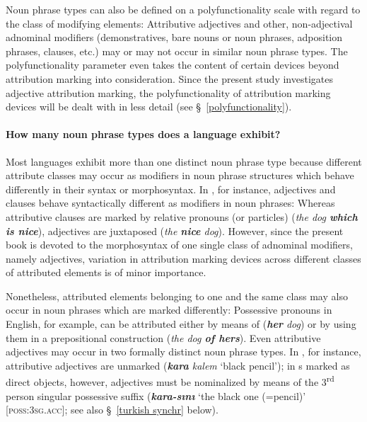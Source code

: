 Noun phrase types can also be defined on a polyfunctionality scale with regard to the class of modifying elements: Attributive adjectives and other, non-adjectival adnominal modifiers (demonstratives, bare nouns or noun phrases, adposition phrases, clauses, etc.) may or may not occur in similar noun phrase types. The polyfunctionality parameter even takes the content of certain devices beyond attribution marking into consideration. Since the present study investigates adjective attribution marking, the polyfunctionality of attribution marking devices will be dealt with in less detail (see \S~\ref{polyfunctionality}). 

\paragraph{How many noun phrase types does a language exhibit?} 
Most languages exhibit more than one distinct noun phrase type because different attribute classes may occur as modifiers in noun phrase structures which behave differently in their syntax or morphosyntax. In , for instance, adjectives and clauses behave syntactically different as modifiers in noun phrases: Whereas attributive clauses are marked by relative pronouns (or particles) (\textit{the dog \textbf{which is nice}}), adjectives are juxtaposed (\textit{the \textbf{nice} dog}). However, since the present book is devoted to the morphosyntax of one single class of adnominal modifiers, namely adjectives, variation in attribution marking devices across different classes of attributed elements is of minor importance. 

Nonetheless, attributed elements belonging to one and the same class may also occur in noun phrases which are marked differently: Possessive pronouns in English, for example, can be attributed either by means of  (\textit{\textbf{her} dog}) or by using them in a prepositional construction (\textit{the dog \textbf{of hers}}). Even attributive adjectives may occur in two formally distinct noun phrase types. In , for instance, attributive adjectives are unmarked (\textit{\textbf{kara} kalem} ‘black pencil’); in s marked as direct objects, however, adjectives must be nominalized by means of the 3\textsuperscript{rd} person singular possessive suffix (\textit{\textbf{kara-sını}} ‘the black one (=pencil)’ [\textsc{poss:3sg.acc}]; see also \S~\ref{turkish synchr} below). 

